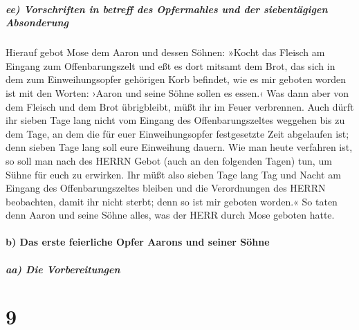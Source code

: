 \hypertarget{ee-vorschriften-in-betreff-des-opfermahles-und-der-siebentuxe4gigen-absonderung}{%
\subparagraph{ee) Vorschriften in betreff des Opfermahles und der
siebentägigen
Absonderung}\label{ee-vorschriften-in-betreff-des-opfermahles-und-der-siebentuxe4gigen-absonderung}}

Hierauf gebot Mose dem Aaron und dessen Söhnen: »Kocht
das Fleisch am Eingang zum Offenbarungszelt und eßt es dort mitsamt dem
Brot, das sich in dem zum Einweihungsopfer gehörigen Korb befindet, wie
es mir geboten worden ist mit den Worten: ›Aaron und seine Söhne sollen
es essen.‹ Was dann aber von dem Fleisch und dem Brot
übrigbleibt, müßt ihr im Feuer verbrennen. Auch dürft ihr
sieben Tage lang nicht vom Eingang des Offenbarungszeltes weggehen bis
zu dem Tage, an dem die für euer Einweihungsopfer festgesetzte Zeit
abgelaufen ist; denn sieben Tage lang soll eure Einweihung dauern.
Wie man heute verfahren ist, so soll man nach des HERRN
Gebot (auch an den folgenden Tagen) tun, um Sühne für euch zu erwirken.
Ihr müßt also sieben Tage lang Tag und Nacht am Eingang
des Offenbarungszeltes bleiben und die Verordnungen des HERRN
beobachten, damit ihr nicht sterbt; denn so ist mir geboten worden.«
So taten denn Aaron und seine Söhne alles, was der HERR
durch Mose geboten hatte.

\hypertarget{b-das-erste-feierliche-opfer-aarons-und-seiner-suxf6hne}{%
\paragraph{b) Das erste feierliche Opfer Aarons und seiner
Söhne}\label{b-das-erste-feierliche-opfer-aarons-und-seiner-suxf6hne}}

\hypertarget{aa-die-vorbereitungen}{%
\subparagraph{aa) Die Vorbereitungen}\label{aa-die-vorbereitungen}}

\hypertarget{section-8}{%
\section{9}\label{section-8}}

